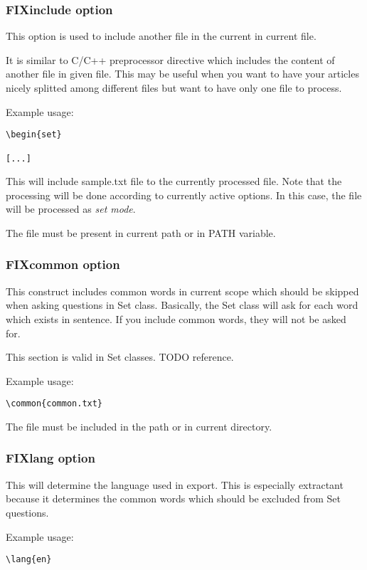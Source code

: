 \documentclass[a4paper,11pt]{article}
\begin{document}

\subsubsection{FIXinclude option}
This option is used to include another file in the current in current file.

It is similar to C/C++ preprocessor directive which includes the content of
another file in given file.
This may be useful when you want to have your articles nicely splitted among
different files but want to have only one file to process.

Example usage:
\begin{verbatim}
\begin{set}

[...]
\end{verbatim}

This will include sample.txt file to the currently processed file.
Note that the processing will be done according to currently active options. In
this case, the file will be processed as \textit{set mode}.

The file must be present in current path or in PATH variable.
\subsubsection{FIXcommon option}
This construct includes common words in current scope which should be skipped
when asking questions in Set class.
Basically, the Set class will ask for each word which exists in sentence. If
you include common words, they will not be asked for.

This section is valid in Set classes. TODO reference.


Example usage:
\begin{verbatim}
\common{common.txt}
\end{verbatim}

The file must be included in the path or in current directory.
\subsubsection{FIXlang option}
This will determine the language used in export. This is especially extractant
because it determines the common words which should be excluded from Set
questions.

Example usage:
\begin{verbatim}
\lang{en}
\end{verbatim}
\end{document}
